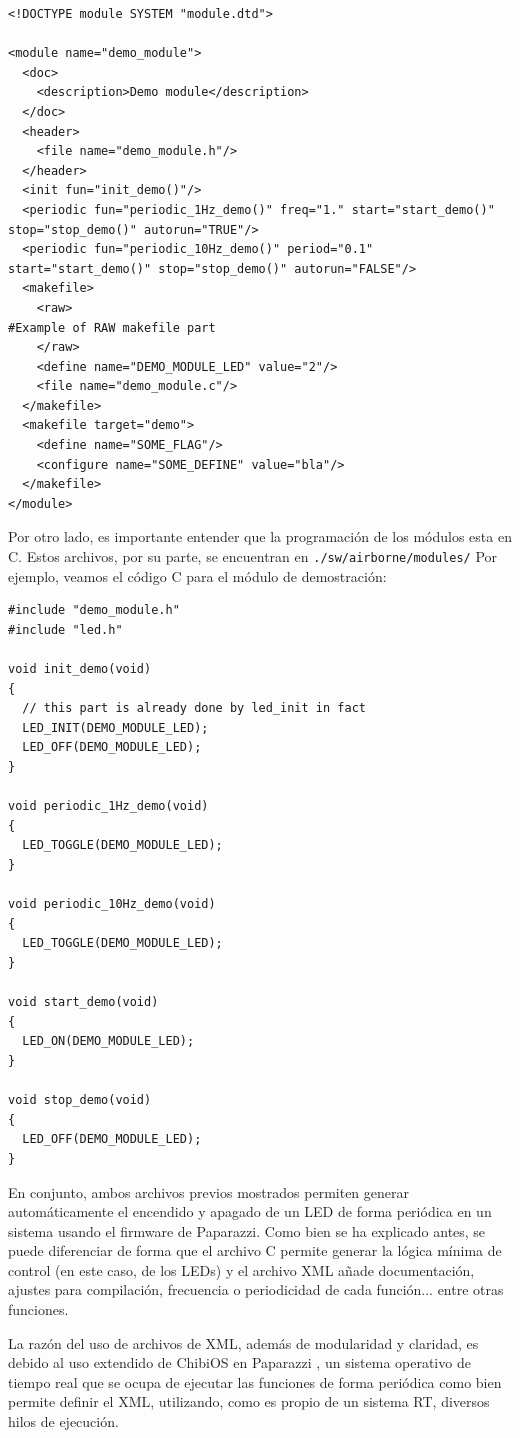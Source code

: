 \begin{lstlisting}[style=CodigoXML]
<!DOCTYPE module SYSTEM "module.dtd">

<module name="demo_module">
  <doc>
    <description>Demo module</description>
  </doc>
  <header>
    <file name="demo_module.h"/>
  </header>
  <init fun="init_demo()"/>
  <periodic fun="periodic_1Hz_demo()" freq="1." start="start_demo()" stop="stop_demo()" autorun="TRUE"/>
  <periodic fun="periodic_10Hz_demo()" period="0.1" start="start_demo()" stop="stop_demo()" autorun="FALSE"/>
  <makefile>
    <raw>
#Example of RAW makefile part
    </raw>
    <define name="DEMO_MODULE_LED" value="2"/>
    <file name="demo_module.c"/>
  </makefile>
  <makefile target="demo">
    <define name="SOME_FLAG"/>
    <configure name="SOME_DEFINE" value="bla"/>
  </makefile>
</module>
\end{lstlisting}

Por otro lado, es importante entender que la programación de los módulos esta en C. 
Estos archivos, por su parte, se encuentran en 
\texttt{./sw/airborne/modules/}
Por ejemplo, veamos el código C para el módulo de demostración:

\begin{lstlisting}[style=CodigoC]
#include "demo_module.h"
#include "led.h"

void init_demo(void)
{
  // this part is already done by led_init in fact
  LED_INIT(DEMO_MODULE_LED);
  LED_OFF(DEMO_MODULE_LED);
}

void periodic_1Hz_demo(void)
{
  LED_TOGGLE(DEMO_MODULE_LED);
}

void periodic_10Hz_demo(void)
{
  LED_TOGGLE(DEMO_MODULE_LED);
}

void start_demo(void)
{
  LED_ON(DEMO_MODULE_LED);
}

void stop_demo(void)
{
  LED_OFF(DEMO_MODULE_LED);
}
\end{lstlisting}

En conjunto, ambos archivos previos mostrados permiten generar automáticamente el encendido y apagado de un LED de forma periódica en un sistema usando el firmware de Paparazzi. 
Como bien se ha explicado antes, se puede diferenciar de forma que el archivo C permite generar la lógica mínima de control (en este caso, de los LEDs) 
y el archivo XML añade documentación, ajustes para compilación, frecuencia o periodicidad de cada función... entre otras funciones.

La razón del uso de archivos de XML, además de modularidad y claridad, es debido al uso extendido de ChibiOS en Paparazzi \cite{chibios-paparazzi}, 
un sistema operativo de tiempo real que se ocupa de ejecutar las funciones de forma periódica como bien permite definir el XML, 
utilizando, como es propio de un sistema RT, diversos hilos de ejecución. 


